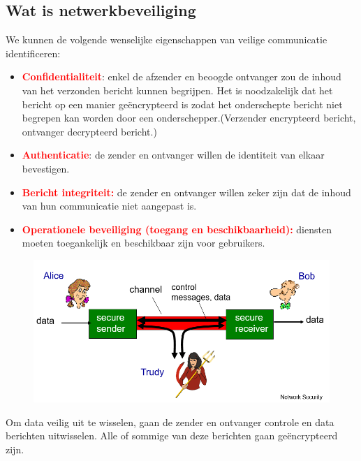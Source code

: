 \subsection{Wat is netwerkbeveiliging}
We kunnen de volgende wenselijke eigenschappen van veilige communicatie identificeren:
\begin{itemize}
    \item \textcolor{red}{\textbf{Confidentialiteit}}: enkel de afzender en beoogde ontvanger zou de inhoud van het verzonden bericht kunnen begrijpen. Het is noodzakelijk dat het bericht op een manier geëncrypteerd is zodat het onderschepte bericht niet begrepen kan worden door een onderschepper.(Verzender encrypteerd bericht, ontvanger decrypteerd bericht.)
    \item \textcolor{red}{\textbf{Authenticatie}}: de zender en ontvanger willen de identiteit van elkaar bevestigen.
    \item \textcolor{red}{\textbf{Bericht integriteit:}} de zender en ontvanger willen zeker zijn dat de inhoud van hun communicatie niet aangepast is.
    \item \textcolor{red}{\textbf{Operationele beveiliging (toegang en beschikbaarheid):}} diensten moeten toegankelijk en beschikbaar zijn voor gebruikers.
\end{itemize}

\begin{figure}[h]
    \centering
    \includegraphics[width=7in]{./img/imghfdst8/hfdst8puntje1.png}\\[1cm]
    \caption{ }      
    \label{fig: }
\end{figure}
\noindent Om data veilig uit te wisselen, gaan de zender en ontvanger controle en data berichten uitwisselen. Alle of sommige van deze berichten gaan geëncrypteerd zijn. 

